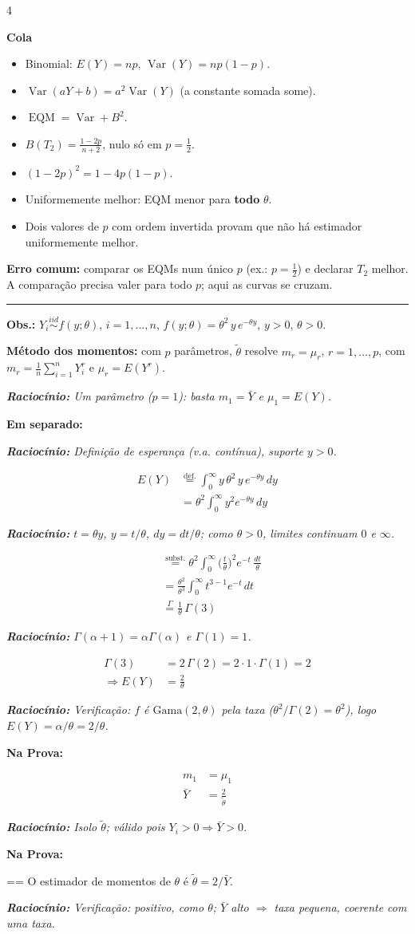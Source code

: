 \documentclass[8pt]{extarticle}
\newcommand{\fit}[1]{\par\vspace{1pt}\noindent\sbox{\fitbox}{$\displaystyle #1$}%
  \ifdim\wd\fitbox>\linewidth\resizebox{\linewidth}{!}{\usebox{\fitbox}}%
  \else\makebox[\linewidth]{\usebox{\fitbox}}\fi\par\vspace{1pt}}
\def\[#1\]{\fit{#1}}
\newcommand{\Var}{\operatorname{Var}}
\newcommand{\EQM}{\operatorname{EQM}}
\newcommand{\ov}[1]{\overset{\text{#1}}{=}}
\newcommand{\ex}[1]{\par\vspace{5pt}\noindent{\normalsize\bfseries Exercício #1}\par\vspace{1pt}\hrule\vspace{2pt}}
\newcommand{\rac}[1]{\par{\scriptsize\itshape\textbf{Raciocínio:} #1}\par}
\newcommand{\prova}{\par\noindent\textbf{Na Prova:}\par}
\newcommand{\sep}{\par\noindent\textbf{Em separado:}\par}
\newcommand{\teo}[2]{\par\noindent\textbf{#1:} #2\par}
\newcommand{\obs}[1]{\par{\scriptsize\textbf{Obs.:} #1}\par}
\newcommand{\res}[1]{\par\vspace{1pt}\noindent{\bfseries\boldmath #1}\par\vspace{1pt}}
\newcommand{\erro}[1]{\par{\scriptsize\textbf{Erro comum:} #1}\par}
\newenvironment{cola}{\par\vspace{2pt}\noindent\textbf{Cola}\begin{itemize}[leftmargin=*,nosep,label=\textbullet]\scriptsize}{\end{itemize}}
\begin{document}
\begin{multicols*}{4}
\begin{cola}
\item Binomial: $E(Y)=np$, $\Var(Y)=np(1-p)$.
\item $\Var(aY+b)=a^2\Var(Y)$ (a constante somada some).
\item $\EQM=\Var+B^2$.
\item $B(T_2)=\frac{1-2p}{n+2}$, nulo só em $p=\frac12$.
\item $(1-2p)^2=1-4p(1-p)$.
\item Uniformemente melhor: EQM menor para \textbf{todo} $\theta$.
\item Dois valores de $p$ com ordem invertida provam que não há estimador uniformemente melhor.
\end{cola}
\erro{comparar os EQMs num único $p$ (ex.: $p=\frac12$) e declarar $T_2$ melhor. A comparação precisa valer para todo $p$; aqui as curvas se cruzam.}

\ex{7}
\obs{$Y_i\overset{iid}{\sim}f(y;\theta)$, $i=1,\dots,n$, $f(y;\theta)=\theta^2\,y\,e^{-\theta y}$, $y>0$, $\theta>0$.}
\teo{Método dos momentos}{com $p$ parâmetros, $\tilde\theta$ resolve $m_r=\mu_r$, $r=1,\dots,p$, com $m_r=\frac1n\sum_{i=1}^n Y_i^r$ e $\mu_r=E(Y^r)$.}
\rac{Um parâmetro ($p=1$): basta $m_1=\bar Y$ e $\mu_1=E(Y)$.}
\sep
\rac{Definição de esperança (v.a. contínua), suporte $y>0$.}
\begin{align*}
E(Y)&\ov{def.}\int_0^\infty y\,\theta^2\,y\,e^{-\theta y}\,dy\\
&=\theta^2\int_0^\infty y^2e^{-\theta y}\,dy
\end{align*}
\rac{$t=\theta y$, $y=t/\theta$, $dy=dt/\theta$; como $\theta>0$, limites continuam $0$ e $\infty$.}
\begin{align*}
&\ov{subst.}\theta^2\int_0^\infty\Big(\frac t\theta\Big)^2e^{-t}\,\frac{dt}{\theta}\\
&=\frac{\theta^2}{\theta^3}\int_0^\infty t^{3-1}e^{-t}\,dt\\
&\ov{$\Gamma$}\frac1\theta\,\Gamma(3)
\end{align*}
\rac{$\Gamma(\alpha+1)=\alpha\Gamma(\alpha)$ e $\Gamma(1)=1$.}
\begin{align*}
\Gamma(3)&=2\,\Gamma(2)=2\cdot1\cdot\Gamma(1)=2\\
\Rightarrow E(Y)&=\frac2\theta
\end{align*}
\rac{Verificação: $f$ é $\text{Gama}(2,\theta)$ pela taxa ($\theta^2/\Gamma(2)=\theta^2$), logo $E(Y)=\alpha/\theta=2/\theta$.}
\prova
\begin{align*}
m_1&=\mu_1\\
\bar Y&=\frac{2}{\tilde\theta}
\end{align*}
\rac{Isolo $\tilde\theta$; válido pois $Y_i>0\Rightarrow\bar Y>0$.}
\prova
\[\tilde\theta==\]
O estimador de momentos de $\theta$ é $\tilde\theta=2/\bar Y$.
\res{$\tilde\theta=\dfrac{2}{\bar Y}$}
\rac{Verificação: positivo, como $\theta$; $\bar Y$ alto $\Rightarrow$ taxa pequena, coerente com uma taxa.}


\end{multicols*}
\end{document}

